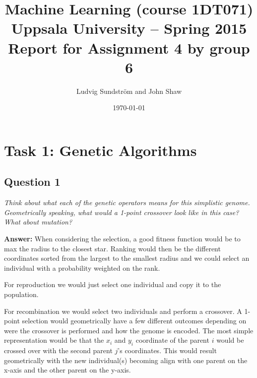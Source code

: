 \documentclass[a4paper]{article}
\title{Machine Learning (course 1DT071)
Uppsala University – Spring 2015
Report for Assignment 4 by group 6}
\author{Ludvig Sundstr\"{o}m and John Shaw}
\date{\today}
\begin{document}

\maketitle

\section*{Task 1: Genetic Algorithms}

\subsection*{Question 1} 

\emph{Think about what each of the genetic operators means for this
simplistic genome. Geometrically speaking, what would a 1-point crossover look like in this case? What about mutation?}

\textbf{Answer:} When considering the selection, a good fitness function would be to max the radius to the closest star. Ranking would then be the different coordinates sorted from the largest to the smallest radius and we could select an individual with a probability weighted on the rank. 

For reproduction we would just select one individual and copy it to the population.

For recombination we would select two individuals and perform a crossover. A 1-point selection would geometrically have a few different outcomes depending on were the crossover is performed and how the genome is encoded. The most simple representation would be that the $x_i$ and $y_i$ coordinate of the parent $i$ would be crossed over with the second parent $j$'s coordinates. This would result geometrically with the new individual(s) becoming align with one parent on the x-axis and the other parent on the y-axis. 
\end{document}
